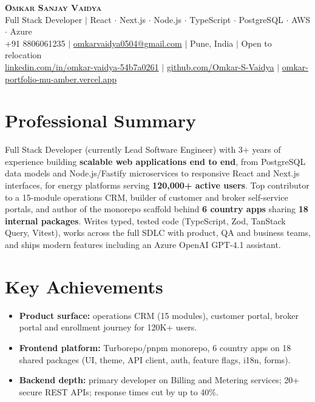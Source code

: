 \documentclass[letterpaper,11pt]{article}
\newcommand{\resumeItem}[1]{\item\small{{#1 \vspace{-2pt}}}}
\newcommand{\resumeSubItem}[1]{\resumeItem{#1}\vspace{-2pt}}
\newcommand{\resumeSubHeadingListStart}{\begin{itemize}[leftmargin=0.15in, label={}]}
\newcommand{\resumeSubHeadingListEnd}{\end{itemize}}
\begin{document}
\begin{center}
\textbf{\Huge \scshape Omkar Sanjay Vaidya} \\ \vspace{2pt}
\large Full Stack Developer $|$ React $\cdot$ Next.js $\cdot$ Node.js $\cdot$ TypeScript $\cdot$ PostgreSQL $\cdot$ AWS $\cdot$ Azure \\ \vspace{2pt}
\small +91 8806061235 $|$
\href{mailto:omkarvaidya0504@gmail.com}{omkarvaidya0504@gmail.com} $|$
Pune, India $|$ Open to relocation \\
\href{https://www.linkedin.com/in/omkar-vaidya-54b7a0261/}{linkedin.com/in/omkar-vaidya-54b7a0261} $|$
\href{https://github.com/Omkar-S-Vaidya}{github.com/Omkar-S-Vaidya} $|$
\href{https://omkar-portfolio-mu-amber.vercel.app/}{omkar-portfolio-mu-amber.vercel.app}
\end{center}

\section{Professional Summary}
\small{Full Stack Developer (currently Lead Software Engineer) with 3+ years of experience building \textbf{scalable web applications end to end}, from PostgreSQL data models and Node.js/Fastify microservices to responsive React and Next.js interfaces, for energy platforms serving \textbf{120,000+ active users}. Top contributor to a 15-module operations CRM, builder of customer and broker self-service portals, and author of the monorepo scaffold behind \textbf{6 country apps} sharing \textbf{18 internal packages}. Writes typed, tested code (TypeScript, Zod, TanStack Query, Vitest), works across the full SDLC with product, QA and business teams, and ships modern features including an Azure OpenAI GPT-4.1 assistant.}

\section{Key Achievements}
\resumeSubHeadingListStart
\resumeSubItem{\textbf{Product surface:} operations CRM (15 modules), customer portal, broker portal and enrollment journey for 120K+ users.}
\resumeSubItem{\textbf{Frontend platform:} Turborepo/pnpm monorepo, 6 country apps on 18 shared packages (UI, theme, API client, auth, feature flags, i18n, forms).}
\resumeSubItem{\textbf{Backend depth:} primary developer on Billing and Metering services; 20+ secure REST APIs; response times cut by up to 40\%.}
\resumeSubHeadingListEnd
\end{document}
